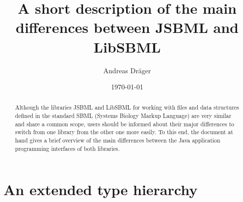 \documentclass[
  letterpaper,
  11pt,
  headsepline,
  pointlessnumbers,
  tablecaptionabove,
  headinclude,
  appendixprefix,
  idxtotoc,
  bibtotoc
]{scrartcl}
\title{A short description of the main differences between JSBML and LibSBML}
\author{Andreas Dr\"ager}
\date{\today}
\begin{document}
\maketitle

\begin{abstract}
Although the libraries JSBML and LibSBML for working with files and data structures 
defined in the standard SBML (Systems Biology Markup Language) are very similar and 
share a common scope, users should be informed about their major differences to 
switch from one library from the other one more easily. To this end, the document at
hand gives a brief overview of the main differences between the Java\texttrademark{} 
application programming interfaces of both libraries.
\end{abstract}

\section{An extended type hierarchy}
\end{document}
